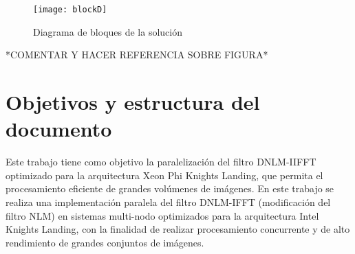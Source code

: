 \begin{figure}[htb]
  \centering
  \texttt{[image: blockD]}
  \caption{Diagrama de bloques de la soluci\'on}
  \label{fig:ltxfig}
\end{figure}

*COMENTAR Y HACER REFERENCIA SOBRE FIGURA*

\section{Objetivos y estructura del documento}


Este trabajo tiene como objetivo la paralelizaci\'on del filtro DNLM-IIFFT optimizado para la arquitectura Xeon Phi Knights Landing, que permita el procesamiento eficiente de grandes vol\'umenes de im\'agenes.
En este trabajo se realiza una implementaci\'on paralela del filtro DNLM-IFFT (modificaci\'on del filtro NLM) en sistemas multi-nodo optimizados para la arquitectura Intel Knights Landing, con la finalidad de realizar procesamiento concurrente y de alto rendimiento de grandes conjuntos de im\'agenes. 



%

